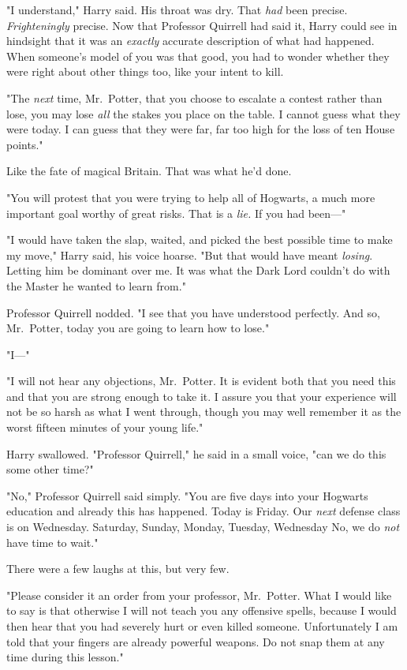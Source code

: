 "I understand," Harry said. His throat was dry. That \emph{had} been precise.
\emph{Frighteningly} precise. Now that Professor Quirrell had said it, Harry
could see in hindsight that it was an \emph{exactly} accurate description of
what had happened. When someone's model of you was that good, you had to wonder
whether they were right about other things too, like your intent to kill.

"The \emph{next} time, Mr.~Potter, that you choose to escalate a contest rather
than lose, you may lose \emph{all} the stakes you place on the table. I cannot
guess what they were today. I can guess that they were far, far too high for
the loss of ten House points."

Like the fate of magical Britain. That was what he'd done.

"You will protest that you were trying to help all of Hogwarts, a much more
important goal worthy of great risks. That is a \emph{lie.} If you had been---"

"I would have taken the slap, waited, and picked the best possible time to make
my move," Harry said, his voice hoarse. "But that would have meant
\emph{losing}. Letting him be dominant over me. It was what the Dark Lord
couldn't do with the Master he wanted to learn from."

Professor Quirrell nodded. "I see that you have understood perfectly. And so,
Mr.~Potter, today you are going to learn how to lose."

"I---"

"I will not hear any objections, Mr.~Potter. It is evident both that you need
this and that you are strong enough to take it. I assure you that your
experience will not be so harsh as what I went through, though you may well
remember it as the worst fifteen minutes of your young life."

Harry swallowed. "Professor Quirrell," he said in a small voice, "can we do
this some other time?"

"No," Professor Quirrell said simply. "You are five days into your Hogwarts
education and already this has happened. Today is Friday. Our \emph{next}
defense class is on Wednesday. Saturday, Sunday, Monday, Tuesday,
Wednesday{\el} No, we do \emph{not} have time to wait."

There were a few laughs at this, but very few.

"Please consider it an order from your professor, Mr.~Potter. What I would like
to say is that otherwise I will not teach you any offensive spells, because I
would then hear that you had severely hurt or even killed someone.
Unfortunately I am told that your fingers are already powerful weapons. Do not
snap them at any time during this lesson."


